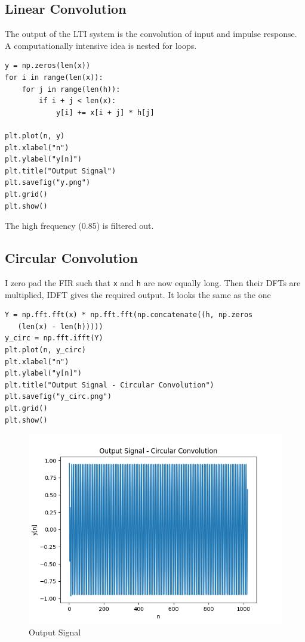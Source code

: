 \documentclass[11pt, a4paper]{article}
\begin{document}
\subsection{Linear Convolution}
The output of the LTI system is the convolution of input and impulse response. A computationally intensive idea is nested for loops.  
\begin{verbatim}
y = np.zeros(len(x))
for i in range(len(x)):
    for j in range(len(h)):
        if i + j < len(x):
            y[i] += x[i + j] * h[j]

plt.plot(n, y)
plt.xlabel("n")
plt.ylabel("y[n]")
plt.title("Output Signal")
plt.savefig("y.png")
plt.grid()
plt.show()
\end{verbatim}

The high frequency (0.85) is filtered out. 

\subsection{Circular Convolution}
I zero pad the FIR such that \texttt{x} and \texttt{h} are now equally long. Then their DFTs are multiplied, IDFT gives the required output. It looks the same as the one 
\begin{verbatim}
Y = np.fft.fft(x) * np.fft.fft(np.concatenate((h, np.zeros
   (len(x) - len(h)))))
y_circ = np.fft.ifft(Y)
plt.plot(n, y_circ)
plt.xlabel("n")
plt.ylabel("y[n]")
plt.title("Output Signal - Circular Convolution")
plt.savefig("y_circ.png")
plt.grid()
plt.show()
\end{verbatim}

\begin{figure}[!tbh]
   	\centering
  \includegraphics[scale=0.5]{y_circ.png} 
    \caption{Output Signal} 	
   \end{figure}  
\end{document}
